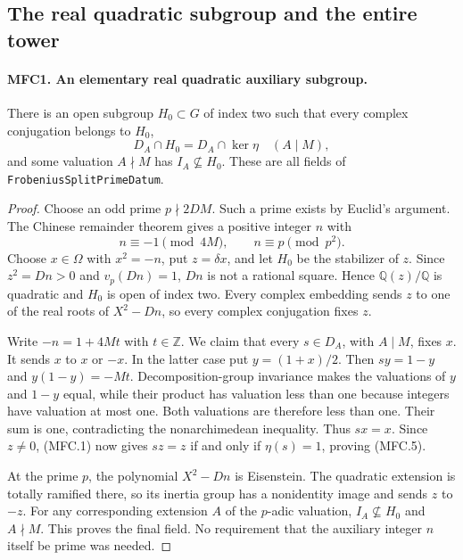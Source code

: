 \documentclass[11pt,a4paper]{article}
\numberwithin{equation}{section}
\theoremstyle{remark}\newtheorem{remark}[theorem]{Remark}
\begin{document}
\subsection{The real quadratic subgroup and the entire tower}

\paragraph{MFC1. An elementary real quadratic auxiliary subgroup.}
\label{claim:MFC1}
There is an open subgroup \(H_0\subset G\) of index two such that
every complex conjugation belongs to \(H_0\),
\[
 D_A\cap H_0=D_A\cap\ker\eta\quad(A\mid M),                \tag{MFC.5}
\]
and some valuation \(A\nmid M\) has \(I_A\not\subseteq H_0\).
These are all fields of \texttt{Frobenius\allowbreak Split\allowbreak Prime\allowbreak Datum}.

\begin{proof}
Choose an odd prime \(p\nmid2DM\).  Such a prime exists by
Euclid's argument.  The Chinese remainder theorem gives a positive
integer \(n\) with
\[
                  n\equiv-1\pmod{4M},\qquad
                  n\equiv p\pmod{p^2}.                    \tag{MFC.6}
\]
Choose \(x\in\Omega\) with \(x^2=-n\), put \(z=\delta x\),
and let \(H_0\) be the stabilizer of \(z\).  Since
\(z^2=Dn>0\) and \(v_p(Dn)=1\), \(Dn\) is not a rational
square.  Hence \(\mathbb Q(z)/\mathbb Q\) is quadratic and
\(H_0\) is open of index two.  Every complex embedding sends
\(z\) to one of the real roots of \(X^2-Dn\), so every complex
conjugation fixes \(z\).

Write \(-n=1+4Mt\) with \(t\in\mathbb Z\).  We claim that
every \(s\in D_A\), with \(A\mid M\), fixes \(x\).
It sends \(x\) to \(x\) or \(-x\).  In the latter case put
\(y=(1+x)/2\).  Then \(sy=1-y\) and
\(y(1-y)=-Mt\).  Decomposition-group invariance makes the
valuations of \(y\) and \(1-y\) equal, while their product
has valuation less than one because integers have valuation at
most one.  Both valuations are therefore less than one.
Their sum is one, contradicting the nonarchimedean inequality.
Thus \(sx=x\).  Since \(z\ne0\), (MFC.1) now gives
\(sz=z\) if and only if \(\eta(s)=1\), proving (MFC.5).

At the prime \(p\), the polynomial \(X^2-Dn\) is Eisenstein.
The quadratic extension is totally ramified there, so its inertia
group has a nonidentity image and sends \(z\) to \(-z\).
For any corresponding extension \(A\) of the \(p\)-adic
valuation, \(I_A\not\subseteq H_0\) and \(A\nmid M\).
This proves the final field.  No requirement that the auxiliary
integer \(n\) itself be prime was needed.
\end{proof}
\end{document}
